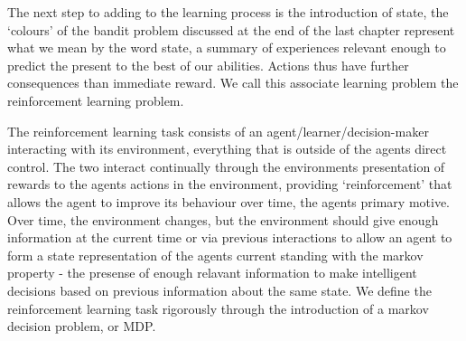 The next step to adding to the learning process is the introduction of state, the `colours' of the bandit problem discussed at the end of the last chapter represent what we mean by the word state, a summary of experiences relevant enough to predict the present to the best of our abilities. Actions thus have further consequences than immediate reward. We call this associate learning problem the reinforcement learning problem.

The reinforcement learning task consists of an agent/learner/decision-maker interacting with its environment, everything that is outside of the agents direct control. The two interact continually through the environments presentation of rewards to the agents actions in the environment, providing `reinforcement' that allows the agent to improve its behaviour over time, the agents primary motive. Over time, the environment changes, but the environment should give enough information at the current time or via previous interactions to allow an agent to form a state representation of the agents current standing with the markov property - the presense of enough relavant information to make intelligent decisions based on previous information about the same state. We define the reinforcement learning task rigorously through the introduction of a markov decision problem, or MDP.

